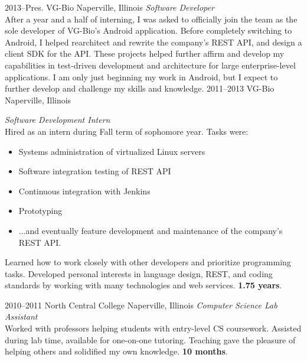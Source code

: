 \documentclass[]{friggeri-cv} %
\begin{document}
\begin{entrylist}
\entry
{2013--Pres.}
{VG-Bio}
{Naperville, Illinois}
{\emph{Software Developer} \\
    After a year and a half of interning, I was asked to officially join the team as the sole developer of VG-Bio's Android application.
    Before completely switching to Android, I helped rearchitect and rewrite the company's REST API, and design a client SDK for the API.
    These projects helped further affirm and develop my capabilities in test-driven development and architecture for large enterprise-level applications.
    I am only just beginning my work in Android, but I expect to further develop and challenge my skills and knowledge.
}
\entry
{2011--2013}
{VG-Bio}
{Naperville, Illinois}
{\emph{Software Development Intern} \\
    Hired as an intern during Fall term of sophomore year.
    Tasks were:
    \begin{itemize}
        \item Systems administration of virtualized Linux servers
        \item Software integration testing of REST API
        \item Continuous integration with Jenkins
        \item Prototyping
        \item ...and eventually feature development and maintenance of the company's REST API.
    \end{itemize}
    Learned how to work closely with other developers and prioritize programming tasks.
    Developed personal interests in language design, REST, and coding standards by working with many technologies and web services. \textbf{1.75 years}.}
\entry
{2010--2011}
{North Central College}
{Naperville, Illinois}
{\emph{Computer Science Lab Assistant} \\
Worked with professors helping students with entry-level CS coursework.
Assisted during lab time, available for one-on-one tutoring.
Teaching gave the pleasure of helping others and solidified my own knowledge. \textbf{10 months}.}
\end{entrylist}
\end{document}

